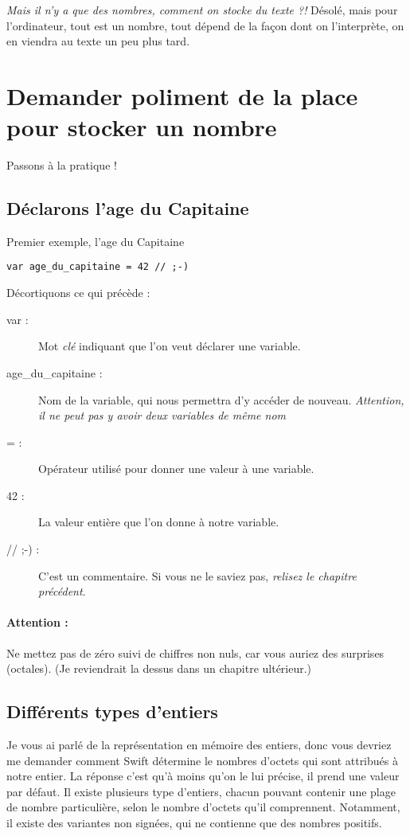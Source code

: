 \emph{Mais il n'y a que des nombres, comment on stocke du texte ?!}
Désolé, mais pour l'ordinateur, tout est un nombre,
tout dépend de la façon dont on l'interprète,
on en viendra au texte un peu plus tard.

\section{Demander poliment de la place pour stocker un nombre}
Passons à la pratique !

\subsection{Déclarons l'age du Capitaine}

\begin{listing}[h]
\caption{Premier exemple, l'age du Capitaine}
\begin{verbatim}
var age_du_capitaine = 42 // ;-)
\end{verbatim}
\end{listing}

Décortiquons ce qui précède :
\begin{description}
\item[var :] Mot \emph{clé} indiquant que l'on veut déclarer une variable.
\item[age\_du\_capitaine :] Nom de la variable,
qui nous permettra d'y accéder de nouveau.
\emph{Attention, il ne peut pas y avoir deux variables de même nom}
\item[= :] Opérateur utilisé pour donner une valeur à une variable.
\item[42 :] La valeur entière que l'on donne à notre variable.
\item[// ;-) :] C'est un commentaire. Si vous ne le saviez pas, \emph{relisez le chapitre précédent}.
\end{description}
\paragraph{Attention :}
Ne mettez pas de zéro suivi de chiffres non nuls,
car vous auriez des surprises (octales).
(Je reviendrait la dessus dans un chapitre ultérieur.)
\subsection{Différents types d'entiers}
Je vous ai parlé de la représentation en mémoire des entiers,
donc vous devriez me demander comment Swift détermine
le nombres d'octets qui sont attribués à notre entier.
La réponse c'est qu'à moins qu'on le lui précise,
il prend une valeur par défaut.
Il existe plusieurs type d'entiers,
chacun pouvant contenir une plage de nombre particulière,
selon le nombre d'octets qu'il comprennent.
Notamment, il existe des variantes non signées,
qui ne contienne que des nombres positifs.

